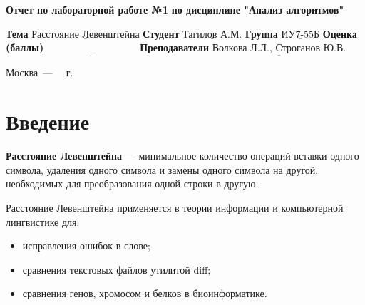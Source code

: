 \documentclass[12pt]{report}
\begin{document}
\begin{titlepage}
        \begin{center}
            \noindent\begin{minipage}{1.3\textwidth}
                         \centering
                         \Large\textbf{  Отчет по лабораторной работе №1}\newline
                         \textbf{по дисциплине "Анализ алгоритмов"}\newline\newline
            \end{minipage}
        \end{center}

        \noindent\textbf{Тема} $\underline{\text{Расстояние Левенштейна}}$\newline\newline
        \noindent\textbf{Студент} $\underline{\text{Тагилов А.М.}}$\newline\newline
        \noindent\textbf{Группа} $\underline{\text{ИУ7-55Б}}$\newline\newline
        \noindent\textbf{Оценка (баллы)} $\underline{\text{~~~~~~~~~~~~~~~~~~~~~~~~~~~}}$\newline\newline
        \noindent\textbf{Преподаватели} $\underline{\text{Волкова Л.Л., Строганов Ю.В.}}$\newline\newline\newline

        \begin{center}
            \vfill
            Москва~---~\the\year
            ~г.
        \end{center}
    \end{titlepage}

    \tableofcontents

    \newpage
    \chapter*{Введение}
    \textbf{Расстояние Левенштейна} --- минимальное количество операций вставки одного символа, удаления одного символа
    и замены одного символа на другой, необходимых для преобразования одной строки в другую.

    Расстояние Левенштейна применяется в теории информации и компьютерной лингвистике для:
    \begin{itemize}
        \item исправления ошибок в слове;
        \item сравнения текстовых файлов утилитой diff;
        \item сравнения генов, хромосом и белков в биоинформатике.
    \end{itemize}
\end{document}

